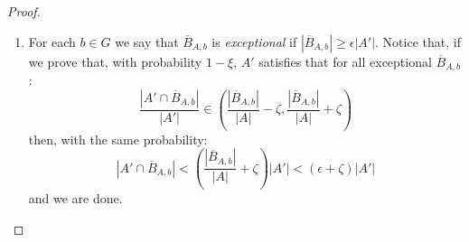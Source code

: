         \begin{proof}
        \begin{enumerate}[label=(\alph*), ref=\alph*]
            \item For each $b \in G$ we say that $\overline{B}_{A,b}$ is \emph{exceptional} if
                $\left| \overline{B}_{A,b} \right| \geq \epsilon \left| A' \right|$.
                Notice that, if we prove that, with probability $1-\xi$, $A'$ satisfies that for all exceptional $\overline{B}_{A,b}$:
                $$
                    \frac{\left| A' \cap \overline{B}_{A,b} \right|}{\left| A' \right|} \in
                         \left( \frac{\left| \overline{B}_{A,b} \right|}{\left| A \right|} -
                         \zeta, \frac{\left| \overline{B}_{A,b} \right|}{\left| A \right|} + \zeta \right)
                $$
                then, with the same probability:
                \begin{equation}\label{eq:equation1}
                    \left| A' \cap \overline{B}_{A,b} \right| < \left( \frac{\left| \overline{B}_{A,b} \right|}{|A|} + \zeta \right) |A'|
                        < \left( \epsilon + \zeta \right) |A'|
                \end{equation}
                and we are done.


\end{enumerate}
\end{proof}
